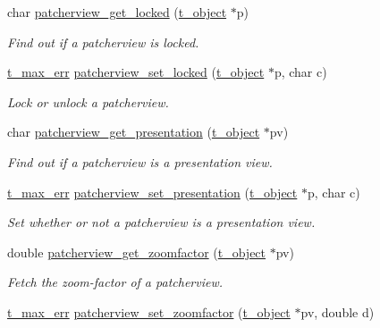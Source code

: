 \begin{DoxyCompactItemize}
char \hyperlink{group__jpatcherview_ga1b78b4ec463f113a0c2778dbebcc8654}{patcherview\_\-get\_\-locked} (\hyperlink{structt__object}{t\_\-object} $\ast$p)
\begin{DoxyCompactList}\small\item\em Find out if a patcherview is locked. \item\end{DoxyCompactList}\item 
\hyperlink{group__datatypes_ga73edaae82b318855cc09fac994918165}{t\_\-max\_\-err} \hyperlink{group__jpatcherview_ga826eb120924785345d8a7851d31ce788}{patcherview\_\-set\_\-locked} (\hyperlink{structt__object}{t\_\-object} $\ast$p, char c)
\begin{DoxyCompactList}\small\item\em Lock or unlock a patcherview. \item\end{DoxyCompactList}\item 
char \hyperlink{group__jpatcherview_ga196c47fa60725d496c75b400da72d8a9}{patcherview\_\-get\_\-presentation} (\hyperlink{structt__object}{t\_\-object} $\ast$pv)
\begin{DoxyCompactList}\small\item\em Find out if a patcherview is a presentation view. \item\end{DoxyCompactList}\item 
\hyperlink{group__datatypes_ga73edaae82b318855cc09fac994918165}{t\_\-max\_\-err} \hyperlink{group__jpatcherview_ga349cf62e72891016e0dcf8ab51c00a62}{patcherview\_\-set\_\-presentation} (\hyperlink{structt__object}{t\_\-object} $\ast$p, char c)
\begin{DoxyCompactList}\small\item\em Set whether or not a patcherview is a presentation view. \item\end{DoxyCompactList}\item 
double \hyperlink{group__jpatcherview_ga3d82e2665c64f9c4452d1737c1429293}{patcherview\_\-get\_\-zoomfactor} (\hyperlink{structt__object}{t\_\-object} $\ast$pv)
\begin{DoxyCompactList}\small\item\em Fetch the zoom-\/factor of a patcherview. \item\end{DoxyCompactList}\item 
\hyperlink{group__datatypes_ga73edaae82b318855cc09fac994918165}{t\_\-max\_\-err} \hyperlink{group__jpatcherview_ga5006e672580027e9ae56c49ca3148c3c}{patcherview\_\-set\_\-zoomfactor} (\hyperlink{structt__object}{t\_\-object} $\ast$pv, double d)

\end{DoxyCompactItemize}
